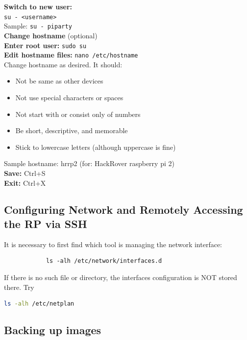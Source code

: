\documentclass[a4paper, 10pt]{article}
\begin{document}
        \noindent \textbf{Switch to new user:} \\
        \texttt{su - <username>}\\
        Sample: \texttt{su - piparty} \\
        
        \noindent \textbf{Change hostname }(optional)\\
        \textbf{Enter root user:} \texttt{sudo su} \\
        \textbf{Edit hostname files:} \texttt{nano /etc/hostname} \\
        
        Change hostname as desired. It should:
        \begin{itemize}
            \item Not be same as other devices
            \item Not use special characters or spaces
            \item Not start with or consist only of numbers
            \item Be short, descriptive, and memorable
            \item Stick to lowercase letters (although uppercase is fine)
        \end{itemize}

        
        \noindent Sample hostname: hrrp2 (for:  HackRover raspberry pi 2)\\
         
        \noindent\textbf{Save:} Ctrl+S \\
        \textbf{Exit:} Ctrl+X 

    \subsection{Configuring Network and Remotely Accessing the RP via SSH}
        It is necessary to first find which tool is managing the network interface:
        \begin{lstlisting}
            ls -alh /etc/network/interfaces.d
        \end{lstlisting}
        If there is no such file or directory, the interfaces configuration is NOT stored there. Try
        
        \begin{lstlisting}[language=bash]
            ls -alh /etc/netplan
        \end{lstlisting}

    \subsection{Backing up images}
\end{document}
